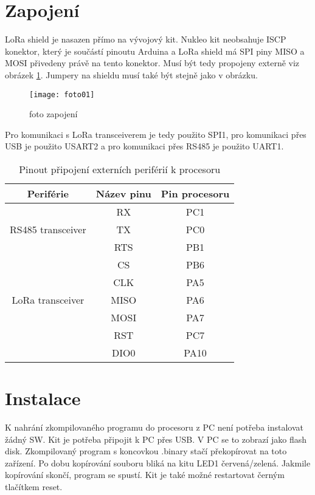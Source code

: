 \newpage
\section{Zapojení}
LoRa shield \cite{draginoWiki} je nasazen přímo na vývojový kit. 
Nukleo kit neobsahuje ISCP konektor, který je součástí pinoutu Arduina a LoRa shield má SPI piny MISO a MOSI přivedeny právě na tento konektor. Musí být tedy propojeny externě viz obrázek \ref{fig:03}.
Jumpery na shieldu musí také být stejně jako v obrázku.

\begin{figure}[!h]
    \centering
    \texttt{[image: foto01]}
    \caption{foto zapojení}
    \label{fig:03}
\end{figure}


Pro komunikaci s LoRa transceiverem je tedy použito SPI1, pro komunikaci přes USB je použito USART2 a pro komunikaci přes RS485 je použito UART1.


\begin{table}[h]
    \centering
    \begin{tabular}{ |c|c|c| }
     \hline

     Periférie          & Název pinu & Pin procesoru           \\ \hline \hline
     
                        & RX  &   PC1            \\
    RS485 transceiver   & TX  &   PC0       \\
                        & RTS  &  PB1      \\     \hline

                        & CS    &  PB6             \\
                        & CLK   &  PA5        \\
   LoRa transceiver     & MISO  &  PA6     \\
                        & MOSI  &  PA7        \\
                        & RST   & PC7          \\
                        & DIO0  & PA10         \\
                        \hline

    \end{tabular}
    \caption{Pinout připojení externích periférií k procesoru}
    \label{table:3}
\end{table}


\section{Instalace}
K nahrání zkompilovaného programu do procesoru z PC není potřeba instalovat žádný SW. 
Kit je potřeba připojit k PC přes USB. V PC se to zobrazí jako flash disk. Zkompilovaný program s koncovkou .binary stačí překopírovat na toto zařízení. Po dobu kopírování souboru bliká na kitu LED1 červená/zelená. Jakmile kopírování skončí, program se spustí. Kit je také možné restartovat černým tlačítkem reset.

